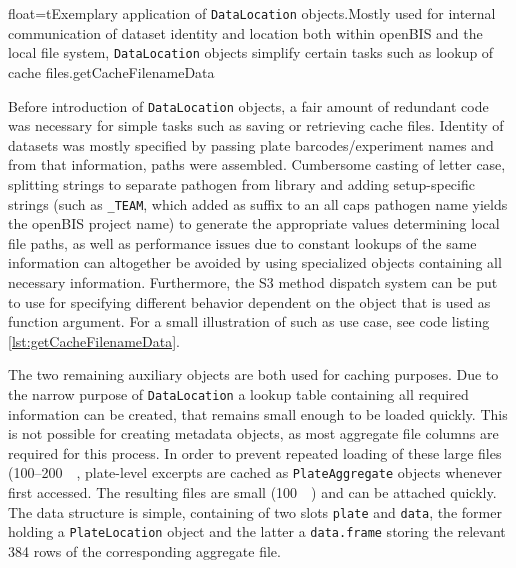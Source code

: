 \begin{rlisting}{float=t}{Exemplary application of \texttt{DataLocation} objects.}{Mostly used for internal communication of dataset identity and location both within openBIS and the local file system, \texttt{DataLocation} objects simplify certain tasks such as lookup of cache files.}{getCacheFilenameData}

\end{rlisting}

Before introduction of \texttt{DataLocation} objects, a fair amount of redundant code was necessary for simple tasks such as saving or retrieving cache files. Identity of datasets was mostly specified by passing plate barcodes\slash experiment names and from that information, paths were assembled. Cumbersome casting of letter case, splitting strings to separate pathogen from library and adding setup-specific strings (such as \texttt{_TEAM}, which added as suffix to an all caps pathogen name yields the openBIS project name) to generate the appropriate values determining local file paths, as well as performance issues due to constant lookups of the same information can altogether be avoided by using specialized objects containing all necessary information. Furthermore, the S3 method dispatch system can be put to use for specifying different behavior dependent on the object that is used as function argument. For a small illustration of such as use case, see code listing \ref{lst:getCacheFilenameData}.

The two remaining auxiliary objects are both used for caching purposes. Due to the narrow purpose of \texttt{DataLocation} a lookup table containing all required information can be created, that remains small enough to be loaded quickly. This is not possible for creating metadata objects, as most aggregate file columns are required for this process. In order to prevent repeated loading of these large files (100--\SI{200}{\mega\byte}, plate-level excerpts are cached as \texttt{PlateAggregate} objects whenever first accessed. The resulting files are small (\tilde \SI{100}{\kilo\byte}) and can be attached quickly. The data structure is simple, containing of two slots \texttt{plate} and \texttt{data}, the former holding a \texttt{PlateLocation} object and the latter a \texttt{data.frame} storing the relevant 384 rows of the corresponding aggregate file.

